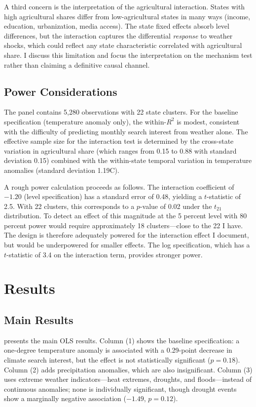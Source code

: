 \documentclass[12pt]{article}
\begin{document}
A third concern is the interpretation of the agricultural interaction. States with high agricultural shares differ from low-agricultural states in many ways (income, education, urbanization, media access). The state fixed effects absorb level differences, but the interaction captures the differential \textit{response} to weather shocks, which could reflect any state characteristic correlated with agricultural share. I discuss this limitation and focus the interpretation on the mechanism test rather than claiming a definitive causal channel.

\subsection{Power Considerations}

The panel contains 5,280 observations with 22 state clusters. For the baseline specification (temperature anomaly only), the within-$R^2$ is modest, consistent with the difficulty of predicting monthly search interest from weather alone. The effective sample size for the interaction test is determined by the cross-state variation in agricultural share (which ranges from 0.15 to 0.88 with standard deviation 0.15) combined with the within-state temporal variation in temperature anomalies (standard deviation 1.19\degree C).

A rough power calculation proceeds as follows. The interaction coefficient of $-1.20$ (level specification) has a standard error of 0.48, yielding a $t$-statistic of 2.5. With 22 clusters, this corresponds to a $p$-value of 0.02 under the $t_{21}$ distribution. To detect an effect of this magnitude at the 5 percent level with 80 percent power would require approximately 18 clusters---close to the 22 I have. The design is therefore adequately powered for the interaction effect I document, but would be underpowered for smaller effects. The log specification, which has a $t$-statistic of 3.4 on the interaction term, provides stronger power.

\section{Results}

\subsection{Main Results}

 presents the main OLS results. Column (1) shows the baseline specification: a one-degree temperature anomaly is associated with a 0.29-point decrease in climate search interest, but the effect is not statistically significant ($p = 0.18$). Column (2) adds precipitation anomalies, which are also insignificant. Column (3) uses extreme weather indicators---heat extremes, droughts, and floods---instead of continuous anomalies; none is individually significant, though drought events show a marginally negative association ($-1.49$, $p = 0.12$).
\end{document}
